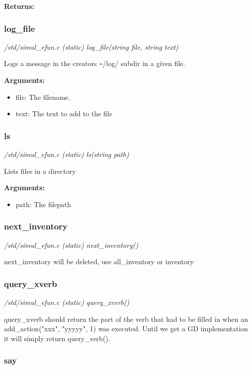 {\bf Returns:} 


\subsubsection{log\_file}

{\em /std/simul\_efun.c (static) log\_file(string file, string text)}

Logs a message in the creators \verb+~+/log/ subdir in a given
file.

{\bf Arguments:}
\begin{itemize}
\item      file: The filename.
\item text: The text to add to the file
\end{itemize}


\subsubsection{ls}

{\em /std/simul\_efun.c (static) ls(string path)}

Lists files in a directory

{\bf Arguments:}
\begin{itemize}
\item      path: The filepath
\end{itemize}


\subsubsection{next\_inventory}

{\em /std/simul\_efun.c (static) next\_inventory()}

next\_inventory will be deleted, use all\_inventory or inventory


\subsubsection{query\_xverb}

{\em /std/simul\_efun.c (static) query\_xverb()}

query\_xverb should return the part of the verb that had to be filled in
when an add\_action("xxx", "yyyyy", 1) was executed.
Until we get a GD implementation it will simply return query\_verb().


\subsubsection{say}


